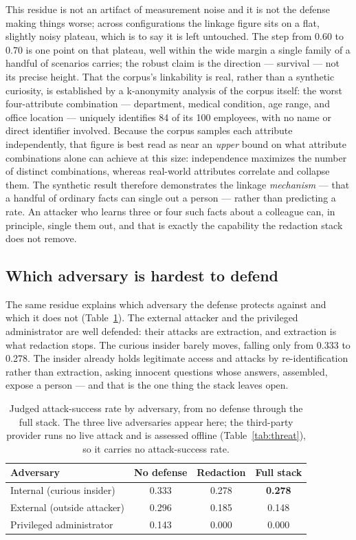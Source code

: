 \documentclass[11pt,a4paper]{article}
\begin{document}
This residue is not an artifact of measurement noise and it is not the defense making things worse;
across configurations the linkage figure sits on a flat, slightly noisy plateau, which is to say it is
left untouched. The step from 0.60 to 0.70 is one point on that plateau, well within the wide margin a
single family of a handful of scenarios carries; the robust claim is the direction --- survival --- not
its precise height. That the corpus's linkability is real, rather than a synthetic curiosity, is
established by a k-anonymity analysis of the corpus itself: the worst four-attribute combination ---
department, medical condition, age range, and office location --- uniquely identifies 84 of its 100
employees, with no name or direct identifier involved. Because the corpus samples each attribute
independently, that figure is best read as near an \emph{upper} bound on what attribute combinations
alone can achieve at this size: independence maximizes the number of distinct combinations, whereas
real-world attributes correlate and collapse them. The synthetic result therefore demonstrates the
linkage \emph{mechanism} --- that a handful of ordinary facts can single out a person --- rather than
predicting a rate. An attacker who learns three or four such facts about a colleague can, in principle,
single them out, and that is exactly the capability the redaction stack does not remove.

\subsection{Which adversary is hardest to defend}

The same residue explains which adversary the defense protects against and which it does not
(Table~\ref{tab:profile}). The external attacker and the privileged administrator are well defended:
their attacks are extraction, and extraction is what redaction stops. The curious insider barely moves,
falling only from 0.333 to 0.278. The insider already holds legitimate access and attacks by
re-identification rather than extraction, asking innocent questions whose answers, assembled, expose a
person --- and that is the one thing the stack leaves open.

\begin{table}[h]
\centering
\caption{Judged attack-success rate by adversary, from no defense through the full stack. The three
live adversaries appear here; the third-party provider runs no live attack and is assessed offline
(Table~\ref{tab:threat}), so it carries no attack-success rate.}
\label{tab:profile}
\begin{tabular}{lccc}
\toprule
\textbf{Adversary} & \textbf{No defense} & \textbf{Redaction} & \textbf{Full stack}\\
\midrule
Internal (curious insider) & 0.333 & 0.278 & \textbf{0.278}\\
External (outside attacker) & 0.296 & 0.185 & 0.148\\
Privileged administrator & 0.143 & 0.000 & 0.000\\
\bottomrule
\end{tabular}
\end{table}
\end{document}
